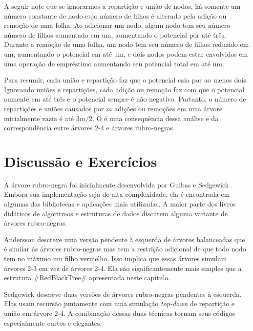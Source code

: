 A seguir note que se ignorarmos a repartição e união de nodos, há somente
um número constante de nodo cujo número de filhos é alterado pela adição
ou remoção de uma folha. Ao adicionar um nodo, algum nodo tem seu número
número de filhos aumentado em um, aumentando o potencial por até três.
Durante a remoção de uma folha, um nodo tem seu número de filhos reduzido
em um, aumentando o potencial em até um, e dois nodos podem estar envolvidos em
uma operação de empréstimo aumentando seu potencial total em até um.

Para resumir, cada união e repartição faz que o potencial caia por ao menos dois.
Ignorando uniões e repartições, cada adição ou remoção faz com que o 
potencial aumente em até três e o potencial sempre é não negativo.
Portanto, o número de repartições e uniões causados por $m$
adições ou remoções em uma árvore inicialmente vazia é até 
$3m/2$.
O  é uma consequência dessa análise e da 
correspondência entre árvores 2-4 e árvores rubro-negras.

\section{Discussão e Exercícios}

A árvore rubro-negra foi inicialmente desenvolvida por Guibas e Sedgewick \cite{gs78}.
Embora sua implementação seja de alta complexidade, ela é encontrada em algumas
das bibliotecas e aplicações mais utilizadas. A maior parte dos livros didáticos
de algoritmos e estruturas de dados discutem alguma variante de 
árvores rubro-negras.

Andersson \cite{a93} descreve uma versão pendente à esquerda de árvores 
balanceadas que é similar às árvores rubro-negras mas tem a 
restrição adicional de que todo nodo tem no máximo um filho vermelho. 
Isso implica que essas árvores simulam árvores 2-3 em vez de árvores 2-4. 
Ela são significantemente mais simples que a estrutura 
#RedBlackTree# apresentada neste capítulo.

Sedgewick \cite{s08} descreve duas versões de árvores rubro-negras 
pendentes à esquerda. Elas usam recursão juntamente com uma simulação 
\emph{top-down} de repartição e união em árvore 2-4. A combinação dessas 
duas técnicas tornam seus códigos especialmente curtos e elegantes.

